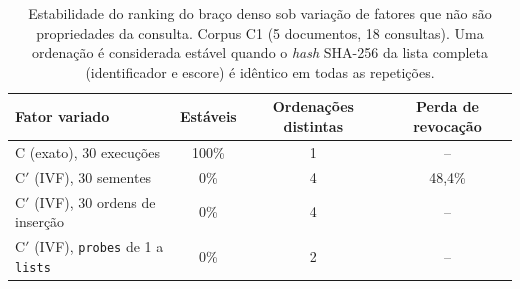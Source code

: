 \begin{table}[htb]
\centering
\caption{Estabilidade do ranking do braço denso sob variação de fatores que não são propriedades da consulta. Corpus C1 (5 documentos, 18 consultas). Uma ordenação é considerada estável quando o \emph{hash} SHA-256 da lista completa (identificador e escore) é idêntico em todas as repetições.}
\label{tab:dense-determinism}
\small
\begin{tabular}{lccc}
\toprule
Fator variado & Estáveis & Ordenações distintas & Perda de revocação \\
\midrule
C (exato), 30 execuções & 100\% & 1 & -- \\
C$'$ (IVF), 30 sementes & 0\% & 4 & 48{,}4\% \\
C$'$ (IVF), 30 ordens de inserção & 0\% & 4 & -- \\
C$'$ (IVF), \texttt{probes} de 1 a \texttt{lists} & 0\% & 2 & -- \\
\bottomrule
\end{tabular}
\end{table}
